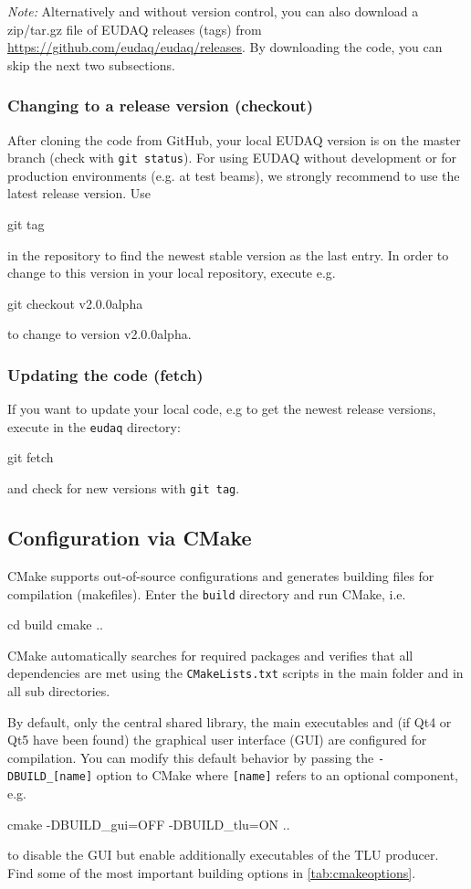 \textit{Note:} Alternatively and without version control, you can also download a zip/tar.gz file of EUDAQ releases (tags) from \url{https://github.com/eudaq/eudaq/releases}. 
By downloading the code, you can skip the next two subsections. 

\subsubsection{Changing to a release version (checkout)}
After cloning the code from GitHub, your local EUDAQ version is on the master branch (check with \texttt{git status}).  
For using EUDAQ without development or for production environments (e.g. at test beams), we strongly recommend to use the latest release version. 
Use 
\begin{listing}[mybash]
git tag 
\end{listing}
in the repository to find the newest stable version as the last entry.
In order to change to this version in your local repository, execute e.g. 
\begin{listing}[mybash]
git checkout v2.0.0alpha
\end{listing}
to change to version v2.0.0alpha.

\subsubsection{Updating the code (fetch)}
If you want to update your local code, e.g to get the newest release versions, execute in the \texttt{eudaq} directory: 
\begin{listing}[mybash]
git fetch
\end{listing}
and check for new versions with \texttt{git tag}. 


\subsection{Configuration via CMake}
\label{sec:cmake}
CMake supports out-of-source configurations and generates building files for compilation (makefiles). 
Enter the \texttt{build} directory and run CMake, i.e.
\begin{listing}[mybash]
cd build
cmake ..
\end{listing}
CMake automatically searches for required packages and verifies that all dependencies are met using the \texttt{CMakeLists.txt} scripts in the main folder and in all sub directories. 

By default, only the central shared library, the main executables and (if Qt4 or Qt5 have been found) the graphical user interface (GUI) are configured for compilation. 
You can modify this default behavior by passing the \texttt{-DBUILD\_[name]} option to
CMake where \texttt{[name]} refers to an optional component, e.g.
\begin{listing}[mybash]
cmake -DBUILD_gui=OFF -DBUILD_tlu=ON ..
\end{listing}
to disable the GUI but enable additionally executables of the TLU producer.
Find some of the most important building options in \autoref{tab:cmakeoptions}.

